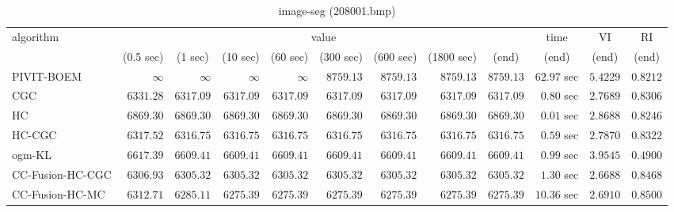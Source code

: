 \begin{table}[H]
\scriptsize
\centering
\caption{image-seg (208001.bmp)}
\label{tab:anytimetable-image-seg-208001.bmp}
\begin{tabular}{lrrrrrrrrrrr}
\toprule
           algorithm &                                   \multicolumn{8}{c}{value} & \multicolumn{1}{c}{time}    & \multicolumn{1}{c}{VI}  & \multicolumn{1}{c}{RI} \\  
\cmidrule(lr){2-9}\cmidrule(lr){10-10} \cmidrule(lr){11-11} \cmidrule(lr){12-12}   
                     & \multicolumn{1}{c}{(0.5 sec)} & \multicolumn{1}{c}{(1 sec)} & \multicolumn{1}{c}{(10 sec)} & \multicolumn{1}{c}{(60 sec)} & \multicolumn{1}{c}{(300 sec)} & \multicolumn{1}{c}{(600 sec)} & \multicolumn{1}{c}{(1800 sec)} & \multicolumn{1}{c}{(end)} & \multicolumn{1}{c}{(end)}    & \multicolumn{1}{c}{(end)}   & \multicolumn{1}{c}{(end)}  \\ \midrule 
          PIVIT-BOEM & $\infty$ & $\infty$ & $\infty$ & $\infty$ & $      8759.13$ & $      8759.13$ & $      8759.13$ & $      8759.13$ & $        62.97$ sec    & $       5.4229$  & $       0.8212$ \\ 
                 CGC & $      6331.28$ & $      6317.09$ & $      6317.09$ & $      6317.09$ & $      6317.09$ & $      6317.09$ & $      6317.09$ & $      6317.09$ & $         0.80$ sec    & $       2.7689$  & $       0.8306$ \\ 
                  HC & $      6869.30$ & $      6869.30$ & $      6869.30$ & $      6869.30$ & $      6869.30$ & $      6869.30$ & $      6869.30$ & $      6869.30$ & $         0.01$ sec    & $       2.8688$  & $       0.8246$ \\ 
              HC-CGC & $      6317.52$ & $      6316.75$ & $      6316.75$ & $      6316.75$ & $      6316.75$ & $      6316.75$ & $      6316.75$ & $      6316.75$ & $         0.59$ sec    & $       2.7870$  & $       0.8322$ \\ 
              ogm-KL & $      6617.39$ & $      6609.41$ & $      6609.41$ & $      6609.41$ & $      6609.41$ & $      6609.41$ & $      6609.41$ & $      6609.41$ & $         0.99$ sec    & $       3.9545$  & $       0.4900$ \\ 
    CC-Fusion-HC-CGC & $      6306.93$ & $      6305.32$ & $      6305.32$ & $      6305.32$ & $      6305.32$ & $      6305.32$ & $      6305.32$ & $      6305.32$ & $         1.30$ sec    & $       2.6688$  & $       0.8468$ \\ 
     CC-Fusion-HC-MC & $      6312.71$ & $      6285.11$ & $      6275.39$ & $      6275.39$ & $      6275.39$ & $      6275.39$ & $      6275.39$ & $      6275.39$ & $        10.36$ sec    & $       2.6910$  & $       0.8500$ \\ 

\end{tabular}
\end{table}
